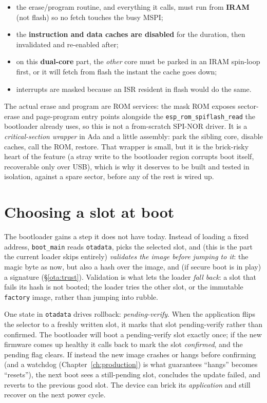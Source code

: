 \begin{itemize}
\item the erase/program routine, and everything it calls, must run from
  \textbf{IRAM} (not flash) so no fetch touches the busy MSPI;
\item the \textbf{instruction and data caches are disabled} for the duration, then
  invalidated and re-enabled after;
\item on this \textbf{dual-core} part, the \emph{other} core must be parked in an
  IRAM spin-loop first, or it will fetch from flash the instant the cache goes down;
\item interrupts are masked because an ISR resident in flash would do the same.
\end{itemize}

The actual erase and program are ROM services: the mask ROM exposes sector-erase
and page-program entry points alongside the \texttt{esp\_rom\_spiflash\_read} the
bootloader already uses, so this is not a from-scratch SPI-NOR driver. It is a
\emph{critical-section wrapper} in Ada and a little assembly: park the sibling core,
disable caches, call the ROM, restore. That wrapper is small, but it is the
brick-risky heart of the feature (a stray write to the bootloader region corrupts
boot itself, recoverable only over USB), which is why it deserves to be built and
tested in isolation, against a spare sector, before any of the rest is wired up.

\section{Choosing a slot at boot}

The bootloader gains a step it does not have today. Instead of loading a fixed
address, \texttt{boot\_main} reads \texttt{otadata}, picks the selected slot, and
(this is the part the current loader skips entirely) \emph{validates the image
before jumping to it}: the magic byte as now, but also a hash over the image, and
(if secure boot is in play) a signature (\S\ref{ota:trust}). Validation is what lets
the loader \emph{fall back}: a slot that fails its hash is not booted; the loader
tries the other slot, or the immutable \texttt{factory} image, rather than jumping
into rubble.

One state in \texttt{otadata} drives rollback: \emph{pending-verify}. When the
application flips the selector to a freshly written slot, it marks that slot
pending-verify rather than confirmed. The bootloader will boot a pending-verify slot
exactly once; if the new firmware comes up healthy it calls back to mark the slot
\emph{confirmed}, and the pending flag clears. If instead the new image crashes or
hangs before confirming (and a watchdog (Chapter~\ref{ch:production}) is what
guarantees ``hangs'' becomes ``resets''), the next boot sees a still-pending slot,
concludes the update failed, and reverts to the previous good slot. The device can
brick its \emph{application} and still recover on the next power cycle.

